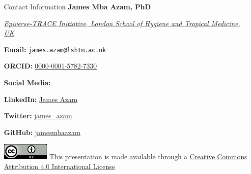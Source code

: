 \documentclass[
  ignorenonframetext,
]{beamer}
\begin{document}
\begin{frame}
\begin{block}{Contact Information}
\label{contact-information}
\textbf{James Mba Azam, PhD}

\href{https://epiverse-trace.github.io/}{\emph{Epiverse-TRACE
Initiative, London School of Hygiene and Tropical Medicine, UK}}

\textbf{Email:}
\href{mailto:james.azam@lshtm.ac.uk}{\nolinkurl{james.azam@lshtm.ac.uk}}

\textbf{ORCID:}
\href{https://orcid.org/0000-0001-5782-7330}{0000-0001-5782-7330}

\textbf{Social Media:}

\textbf{LinkedIn:}
\href{https://www.linkedin.com/in/james-azam-phd-6b5b00176/}{James Azam}

\textbf{Twitter:} \href{https://twitter.com/james_azam}{james\_azam}

\textbf{GitHub:} \href{https://github.com/jamesmbaazam}{jamesmbaazam}
\end{block}
\end{frame}

\begin{frame}
\includegraphics{slides_files/mediabag/88x31.png} This presentation is
made available through a
\href{https://creativecommons.org/licenses/by/4.0/}{Creative Commons
Attribution 4.0 International License}
\end{frame}
\end{document}
